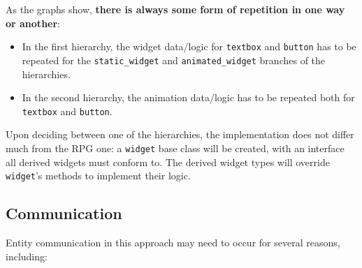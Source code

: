 \documentclass[oneside, 12pt, a4paper, openany]{book}
\begin{document}
As the graphs show, \textbf{there is always some form of repetition in
one way or another}:

\begin{itemize}
\item
  In the first hierarchy, the widget data/logic for
  \texttt{textbox}
  and
  \texttt{button}
  has to be repeated for the
  \texttt{static_widget}
  and
  \texttt{animated_widget}
  branches of the hierarchies.
\item
  In the second hierarchy, the animation data/logic has to be repeated
  both for
  \texttt{textbox}
  and
  \texttt{button}.
\end{itemize}

Upon deciding between one of the hierarchies, the implementation does
not differ much from the RPG one: a
\texttt{widget}
base class will be created, with an interface all derived widgets must
conform to. The derived widget types will override
\texttt{widget}'s
methods to implement their logic.

\hypertarget{chapter_oop_communication}{\subsection{Communication}\label{chapter_oop_communication}}

Entity communication in this approach may need to occur for several
reasons, including:
\end{document}

